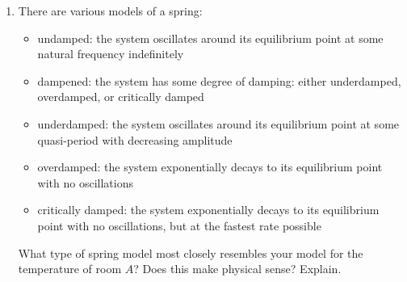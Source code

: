 \begin{enumerate}
\begin{enumerate}
    \item There are various models of a spring:
    \begin{itemize}
        \item undamped: the system oscillates around its equilibrium point at some natural frequency indefinitely
        \item dampened: the system has some degree of damping: either underdamped, overdamped, or critically damped
        \item underdamped: the system oscillates around its equilibrium point at some quasi-period with decreasing amplitude
        \item overdamped: the system exponentially decays to its equilibrium point with no oscillations
        \item critically damped: the system exponentially decays to its equilibrium point with no oscillations, but at the fastest rate possible
    \end{itemize}
    
    What type of spring model most closely resembles your model for the temperature of room $A$? Does this make physical sense? Explain.
    
\end{enumerate}



\end{enumerate}